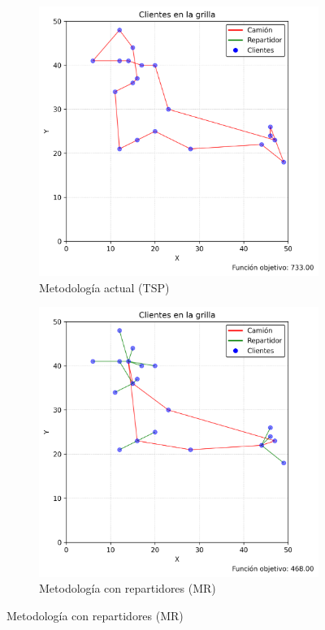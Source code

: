 \documentclass[10pt]{article}
\begin{document}
\clearpage

\begin{figure}[htbp]
	\centering
	\begin{subfigure}[b]{0.45\textwidth}
		\centering
		\includegraphics[width=\textwidth]{figuras/plano_clusters_tsp_0.png}
		\caption{Metodología actual (TSP)}
		\label{fig:sub1}
	\end{subfigure}
	\hfill
	\begin{subfigure}[b]{0.45\textwidth}
		\centering
		\includegraphics[width=\textwidth]{figuras/plano_clusters_repartidores_0.png}
		\caption{Metodología con repartidores (MR)}
		\label{fig:sub2}
	\end{subfigure}
	

\end{figure}
\end{document}
